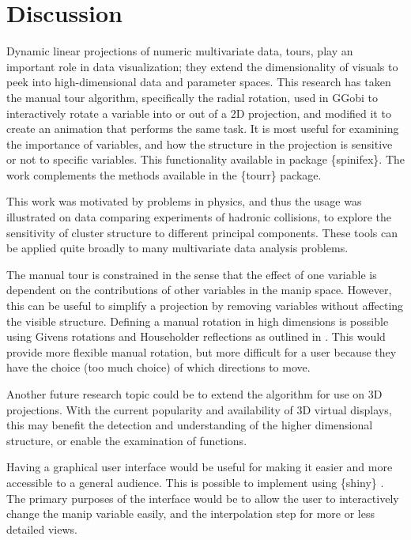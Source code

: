 \documentclass{template/monashthesis}
\begin{document}
\hypertarget{sec:discussion}{%
\section{Discussion}\label{sec:discussion}}

Dynamic linear projections of numeric multivariate data, tours, play an important role in data visualization; they extend the dimensionality of visuals to peek into high-dimensional data and parameter spaces. This research has taken the manual tour algorithm, specifically the radial rotation, used in GGobi \autocite{swayne_ggobi:_2003} to interactively rotate a variable into or out of a 2D projection, and modified it to create an animation that performs the same task. It is most useful for examining the importance of variables, and how the structure in the projection is sensitive or not to specific variables. This functionality available in package \{spinifex\}. The work complements the methods available in the \{tourr\} package.

This work was motivated by problems in physics, and thus the usage was illustrated on data comparing experiments of hadronic collisions, to explore the sensitivity of cluster structure to different principal components. These tools can be applied quite broadly to many multivariate data analysis problems.

The manual tour is constrained in the sense that the effect of one variable is dependent on the contributions of other variables in the manip space. However, this can be useful to simplify a projection by removing variables without affecting the visible structure. Defining a manual rotation in high dimensions is possible using Givens rotations and Householder reflections as outlined in \textcite{buja_computational_2005}. This would provide more flexible manual rotation, but more difficult for a user because they have the choice (too much choice) of which directions to move.

Another future research topic could be to extend the algorithm for use on 3D projections. With the current popularity and availability of 3D virtual displays, this may benefit the detection and understanding of the higher dimensional structure, or enable the examination of functions.

Having a graphical user interface would be useful for making it easier and more accessible to a general audience. This is possible to implement using \{shiny\} \autocite{chang_shiny_2020}. The primary purposes of the interface would be to allow the user to interactively change the manip variable easily, and the interpolation step for more or less detailed views.
\end{document}
